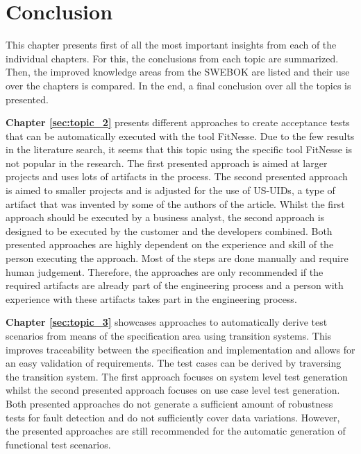 \chapter{Conclusion} \label{chap:conclusion}

This chapter presents first of all the most important insights from each of the individual chapters. For this, the conclusions from each topic are summarized. Then, the improved knowledge areas from the SWEBOK are listed and their use over the chapters is compared. In the end, a final conclusion over all the topics is presented.

\textbf{Chapter \ref{sec:topic_2}} presents different approaches to create acceptance tests that can be automatically executed with the tool FitNesse. Due to the few results in the literature search, it seems that this topic using the specific tool FitNesse is not popular in the research. The first presented approach \cite{el-attar} is aimed at larger projects and uses lots of artifacts in the process. The second presented approach \cite{longo} is aimed to smaller projects and is adjusted for the use of US-UIDs, a type of artifact that was invented by some of the authors of the article. Whilst the first approach should be executed by a business analyst, the second approach is designed to be executed by the customer and the developers combined.  Both presented approaches are highly dependent on the experience and skill of the person executing the approach. Most of the steps are done manually and require human judgement. Therefore, the approaches are only recommended if the required artifacts are already part of the engineering process and a person with experience with these artifacts takes part in the engineering process.

\textbf{Chapter \ref{sec:topic_3}} showcases approaches to automatically derive test scenarios from means of the specification area using transition systems. This improves traceability between the specification and implementation and allows for an easy validation of requirements. The test cases can be derived by traversing the transition system. The first approach \cite{ClementineNebut2006} focuses on system level test generation whilst the second presented approach \cite{NajlaRaza2007} focuses on use case level test generation. Both presented approaches do not generate a sufficient amount of robustness tests for fault detection and do not sufficiently cover data variations. However, the presented approaches are still recommended for the automatic generation of functional test scenarios.

